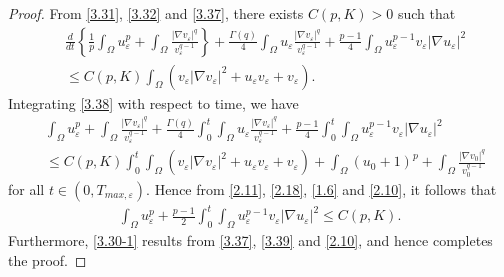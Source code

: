 \documentclass[12pt]{article}
\theoremstyle{plain}
\theoremstyle{definition}
\numberwithin{equation}{section}
\begin{document}
\begin{proof}
From \eqref{3.31}, \eqref{3.32} and \eqref{3.37}, there exists $C(p, K)>0$ such that
\begin{align}\label{3.38}
   &\frac{d}{dt}\left\{ \frac{1}{p}\int_{\Omega}u_{\varepsilon}^{p}+\int_{\Omega}\frac{|\nabla
   v_{\varepsilon}|^q}{v_{\varepsilon}^{q-1}}\right\}
   +\frac{\Gamma(q)}{4}\int_{\Omega}u_{\varepsilon}\frac{|\nabla
   v_{\varepsilon}|^q}{v_{\varepsilon}^{q-1}}+\frac{p-1}{4}\int_{\Omega}u_{\varepsilon}^{p-1}v_{\varepsilon}|\nabla
   u_{\varepsilon}|^2\nonumber\\
   &\leq C(p,K)\int_{\Omega}\left( v_{\varepsilon}|\nabla v_{\varepsilon}|^2+u_{\varepsilon}v_{\varepsilon}+v_{\varepsilon} \right).
\end{align}
 Integrating \eqref{3.38} with respect to time, we  have
\begin{align*}
    &\int_{\Omega}u_{\varepsilon}^{p}+\int_{\Omega}\frac{|\nabla
    v_{\varepsilon}|^q}{v_{\varepsilon}^{q-1}}+\frac{\Gamma(q)}{4}\int_0^{t}\int_{\Omega}u_{\varepsilon}\frac{|\nabla
    v_{\varepsilon}|^q}{v_{\varepsilon}^{q-1}}+\frac{p-1}{4}\int_0^{t}\int_{\Omega}u_{\varepsilon}^{p-1}v_{\varepsilon}|\nabla
    u_{\varepsilon}|^2
    \\
    &\leq C(p,K)\int_0^{t}\int_{\Omega}\left(v_{\varepsilon}|\nabla v_{\varepsilon}|^2+u_{\varepsilon}v_{\varepsilon}+v_{\varepsilon}\right)
      +\int_{\Omega}(u_{0}+1)^p+\int_{\Omega}\frac{|\nabla v_{0}|^q}{v_0^{q-1}}
\end{align*}
for all $t\in (0,T_{max,\varepsilon})$. Hence  from \eqref{2.11}, \eqref{2.18}, \eqref{1.6} and \eqref{2.10}, it
follows that
\begin{align}\label{3.39}
    \int_{\Omega}u_{\varepsilon}^{p}+\frac{p-1}{2}\int_0^{t}\int_{\Omega}u_{\varepsilon}^{p-1}v_{\varepsilon}|\nabla u_{\varepsilon}|^2\leq C(p,
    K).
\end{align}
Furthermore, \eqref{3.30-1} results from \eqref{3.37}, \eqref{3.39} and \eqref{2.10}, and hence completes the proof.
\end{proof}
\end{document}
